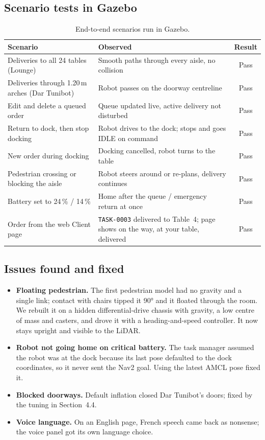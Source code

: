 \documentclass[11pt,a4paper]{article}
\begin{document}
\subsection{Scenario tests in Gazebo}

\begin{table}[H]
\centering
\small
\begin{tabularx}{\linewidth}{l L c}
\toprule
\textbf{Scenario} & \textbf{Observed} & \textbf{Result} \\
\midrule
Deliveries to all 24 tables (Lounge) & Smooth paths through every aisle, no collision & Pass \\
Deliveries through 1.20\,m arches (Dar Tunibot) & Robot passes on the doorway centreline & Pass \\
Edit and delete a queued order & Queue updated live, active delivery not disturbed & Pass \\
Return to dock, then stop docking & Robot drives to the dock; stops and goes IDLE on command & Pass \\
New order during docking & Docking cancelled, robot turns to the table & Pass \\
Pedestrian crossing or blocking the aisle & Robot steers around or re-plans, delivery continues & Pass \\
Battery set to 24\,\% / 14\,\% & Home after the queue / emergency return at once & Pass \\
Order from the web Client page & \texttt{TASK-0003} delivered to Table~4; page shows on the way, at your table, delivered & Pass \\
\bottomrule
\end{tabularx}
\caption{End-to-end scenarios run in Gazebo.}
\end{table}

\subsection{Issues found and fixed}
\label{sec:issues}

\begin{itemize}
  \item \textbf{Floating pedestrian.} The first pedestrian model had no gravity and a single link; contact with chairs tipped it 90° and it floated through the room. We rebuilt it on a hidden differential-drive chassis with gravity, a low centre of mass and casters, and drove it with a heading-and-speed controller. It now stays upright and visible to the LiDAR.
  \item \textbf{Robot not going home on critical battery.} The task manager assumed the robot was at the dock because its last pose defaulted to the dock coordinates, so it never sent the Nav2 goal. Using the latest AMCL pose fixed it.
  \item \textbf{Blocked doorways.} Default inflation closed Dar Tunibot's doors; fixed by the tuning in Section~4.4.
  \item \textbf{Voice language.} On an English page, French speech came back as nonsense; the voice panel got its own language choice.
\end{itemize}
\end{document}
